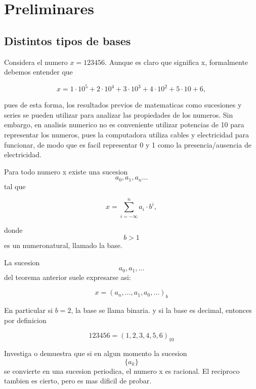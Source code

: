 \documentclass[spanish]{amsart}
\begin{document}
\maketitle
\section{Preliminares}

\subsection{Distintos tipos de bases}

Considera el numero $x = 123456$. Aunque es claro que significa x, formalmente debemos entender que 

\[x = 1 \cdot 10^5 + 2 \cdot 10^4 + 3 \cdot 10^3 + 4 \cdot 10^2 + 5 \cdot 10 + 6,\]

pues de esta forma, los resultados previos de matematicas como sucesiones y series se pueden utilizar para analizar las propiedades de los numeros. Sin embargo, en analisis numerico no es conveniente utilizar potencias de 10 para representar los numeros, pues la computadora utiliza cables y electricidad para funcionar, de modo que es facil representar 0 y  1 como la presencia/ausencia de electricidad.

\begin{theorem}
Para todo numero x existe una sucesion \[a_0, a_1, a_n\ldots\] tal que 

\[x = \sum_{i = -\infty}^n a_i\cdot b^i,\]

donde \[b > 1 \] es un numeronatural, llamado la base.  
\end{theorem}

La sucesion \[a_0, a_1, \ldots\] del teorema anterior suele expresarse asi:

\[x = (a_n, \ldots, a_1, a_0, \ldots)_b\]

En particular si $b = 2$, la base se llama binaria. y si la base es decimal, entonces por definicion

\[123456 = (1, 2, 3, 4, 5, 6)_{10}\]

\begin{exercise}
Investiga o demuestra que si en algun momento la sucesion \[\{a_k\}\] se convierte en una sucesion periodica, el numero x es racional. El reciproco tambien es cierto, pero es mas dificil de probar.
\end{exercise}
\end{document}
